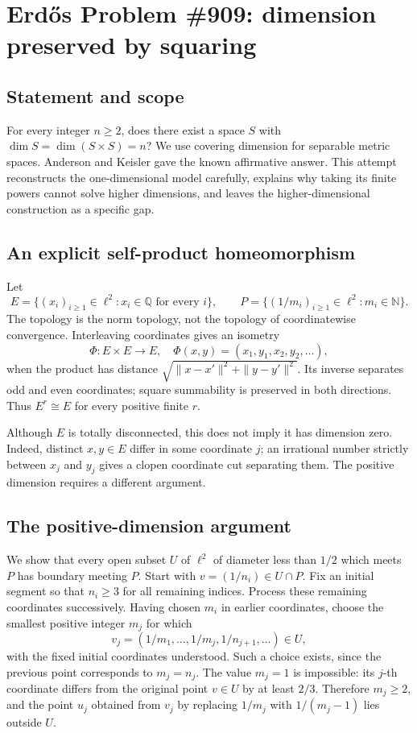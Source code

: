 \section*{Erd\H{o}s Problem \#909: dimension preserved by squaring}
\subsection*{Statement and scope}
For every integer \(n\geq2\), does there exist a space \(S\) with
\(\dim S=\dim(S\times S)=n\)?
We use covering dimension for separable metric spaces. Anderson and Keisler gave the known affirmative answer. This attempt reconstructs the one-dimensional model carefully, explains why taking its finite powers cannot solve higher dimensions, and leaves the higher-dimensional construction as a specific gap.

\subsection*{An explicit self-product homeomorphism}
Let
\[
 E=\{(x_i)_{i\geq1}\in\ell^2:x_i\in\mathbb Q\text{ for every }i\},
 \qquad
 P=\{(1/m_i)_{i\geq1}\in\ell^2:m_i\in\mathbb N\}.
\]
The topology is the norm topology, not the topology of coordinatewise convergence.
Interleaving coordinates gives an isometry
\[
 \Phi:E\times E\longrightarrow E,\quad
 \Phi(x,y)=(x_1,y_1,x_2,y_2,\ldots),
\]
when the product has distance
\(\sqrt{\|x-x'\|^2+\|y-y'\|^2}\).
Its inverse separates odd and even coordinates; square summability is preserved in both directions.
Thus \(E^r\cong E\) for every positive finite \(r\).

Although \(E\) is totally disconnected, this does not imply it has dimension zero.
Indeed, distinct \(x,y\in E\) differ in some coordinate \(j\); an irrational number strictly between \(x_j\) and \(y_j\) gives a clopen coordinate cut separating them.
The positive dimension requires a different argument.

\subsection*{The positive-dimension argument}
We show that every open subset \(U\) of \(\ell^2\) of diameter less than \(1/2\) which meets \(P\) has boundary meeting \(P\).
Start with \(v=(1/n_i)\in U\cap P\). Fix an initial segment so that \(n_i\geq3\) for all remaining indices.
Process these remaining coordinates successively. Having chosen \(m_i\) in earlier coordinates, choose the smallest positive integer \(m_j\) for which
\[
 v_j=(1/m_1,\ldots,1/m_j,1/n_{j+1},\ldots)\in U,
\]
with the fixed initial coordinates understood. Such a choice exists, since the previous point corresponds to \(m_j=n_j\).
The value \(m_j=1\) is impossible: its \(j\)-th coordinate differs from the original point \(v\in U\) by at least \(2/3\).
Therefore \(m_j\geq2\), and the point \(u_j\) obtained from \(v_j\) by replacing \(1/m_j\) with \(1/(m_j-1)\) lies outside \(U\).

